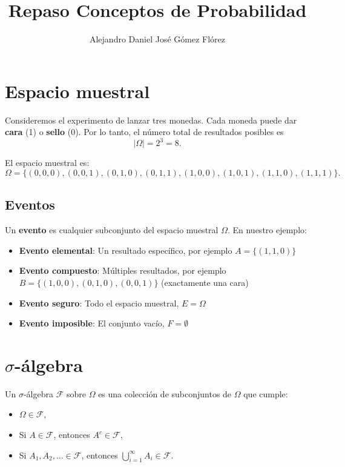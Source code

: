 \documentclass[12pt]{article}
\title{Repaso Conceptos de Probabilidad}
\author{Alejandro Daniel José Gómez Flórez}
\date{}
\begin{document}
\maketitle

\section{Espacio muestral}

Consideremos el experimento de lanzar tres monedas. Cada moneda puede dar
\textbf{cara} (1) o \textbf{sello} (0). Por lo tanto, el número total de
resultados posibles es
\begin{equation*}
|\Omega| = 2^3 = 8.
\end{equation*}

El espacio muestral es:
\begin{equation*}
\Omega = \{(0,0,0), (0,0,1), (0,1,0), (0,1,1), (1,0,0), (1,0,1), (1,1,0), (1,1,1)\}.
\end{equation*}

\subsection{Eventos}

Un \textbf{evento} es cualquier subconjunto del espacio muestral $\Omega$. En nuestro ejemplo:

\begin{itemize}
    \item \textbf{Evento elemental}: Un resultado específico, por ejemplo $A = \{(1,1,0)\}$
    \item \textbf{Evento compuesto}: Múltiples resultados, por ejemplo $B = \{(1,0,0), (0,1,0), (0,0,1)\}$ (exactamente una cara)
    \item \textbf{Evento seguro}: Todo el espacio muestral, $E = \Omega$
    \item \textbf{Evento imposible}: El conjunto vacío, $F = \emptyset$
\end{itemize}

\section{$\sigma$-álgebra}

Un $\sigma$-álgebra $\mathcal{F}$ sobre $\Omega$ es una colección de
subconjuntos de $\Omega$ que cumple:
\begin{itemize}
    \item $\Omega \in \mathcal{F}$,
    \item Si $A \in \mathcal{F}$, entonces $A^c \in \mathcal{F}$,
    \item Si $A_1, A_2, \dots \in \mathcal{F}$, entonces $\bigcup_{i=1}^\infty A_i \in \mathcal{F}$.
\end{itemize}
\end{document}

